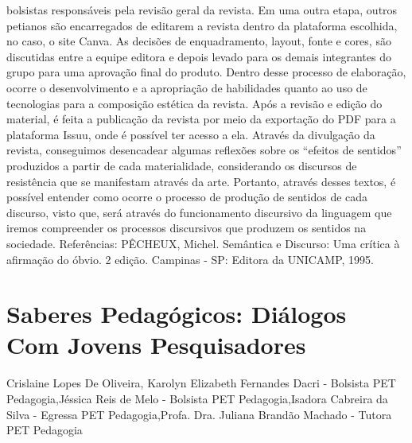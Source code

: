 bolsistas responsáveis pela revisão geral da revista. Em uma outra etapa, outros petianos são
encarregados de editarem a revista dentro da plataforma escolhida, no caso, o site Canva. As
decisões de enquadramento, layout, fonte e cores, são discutidas entre a equipe editora e depois
levado para os demais integrantes do grupo para uma aprovação final do produto. Dentro desse
processo de elaboração, ocorre o desenvolvimento e a apropriação de habilidades quanto ao uso
de tecnologias para a composição estética da revista. Após a revisão e edição do material, é feita
a publicação da revista por meio da exportação do PDF para a plataforma Issuu, onde é possível
ter acesso a ela. Através da divulgação da revista, conseguimos desencadear algumas reflexões
sobre os “efeitos de sentidos” produzidos a partir de cada materialidade, considerando os
discursos de resistência que se manifestam através da arte. Portanto, através desses textos, é
possível entender como ocorre o processo de produção de sentidos de cada discurso, visto que,
será através do funcionamento discursivo da linguagem que iremos compreender os processos
discursivos que produzem os sentidos na sociedade.
Referências:
PÊCHEUX, Michel. Semântica e Discurso: Uma crítica à afirmação do óbvio. 2 edição.
Campinas - SP: Editora da UNICAMP, 1995.




\section*{Saberes Pedagógicos: Diálogos Com Jovens Pesquisadores}

Crislaine Lopes De Oliveira, Karolyn Elizabeth Fernandes Dacri - Bolsista PET Pedagogia,Jéssica Reis de Melo - Bolsista PET Pedagogia,Isadora Cabreira da Silva - Egressa PET Pedagogia,Profa. Dra. Juliana Brandão Machado - Tutora PET Pedagogia

